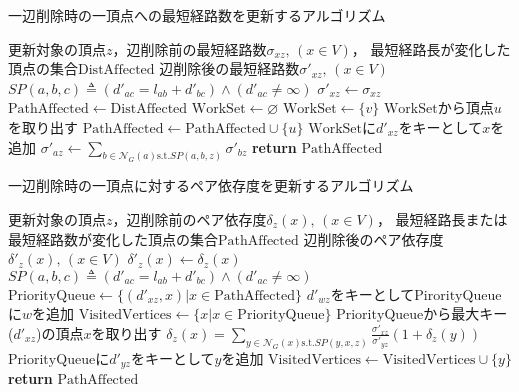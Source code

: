 \begin{algorithm}[H]
  \caption{一辺削除時の一頂点への最短経路数を更新するアルゴリズム}
  \label{algo:update-sigma-on-delete}
  \begin{algorithmic}[1]
    \Require 更新対象の頂点$z$，辺削除前の最短経路数$\sigma_{xz},\,(x\in V)$，
    最短経路長が変化した頂点の集合$\mathrm{DistAffected}$
    \Ensure 辺削除後の最短経路数$\sigma'_{xz},\,(x\in V)$
    \State $SP(a,b,c)\triangleq(d'_{ac}=l_{ab}+d'_{bc})\land(d'_{ac}\neq\infty)$
    \State $\sigma'_{xz}\gets\sigma_{xz}$
    \State $\mathrm{PathAffected}\gets\mathrm{DistAffected}$
    \State $\mathrm{WorkSet}\gets\varnothing$
    \Else
    \State $\mathrm{WorkSet}\gets\{v\}$
    \EndIf
    \State $\mathrm{WorkSet}$から頂点$u$を取り出す
    \State $\mathrm{PathAffected}\gets\mathrm{PathAffected}\cup\{u\}$
    \State $\mathrm{WorkSet}$に$d'_{xz}$をキーとして$x$を追加
    \EndIf
    \EndFor
    \EndWhile
    \State $\sigma'_{az}\gets\sum_{b\in\mathcal{N}_G(a)\mathrm{s.t.}SP(a,b,z)}\sigma'_{bz}$
    \EndFor
    \State \textbf{return} $\mathrm{PathAffected}$
    \EndProcedure
  \end{algorithmic}
\end{algorithm}

\begin{algorithm}[H]
  \caption{一辺削除時の一頂点に対するペア依存度を更新するアルゴリズム}
  \label{algo:update-pd-on-delete}
  \begin{algorithmic}[1]
    \Require 更新対象の頂点$z$，辺削除前のペア依存度$\delta_z(x),\,(x\in V)$，
    最短経路長または最短経路数が変化した頂点の集合$\mathrm{PathAffected}$
    \Ensure 辺削除後のペア依存度$\delta'_z(x),\,(x\in V)$
    \State $\delta'_z(x)\gets\delta_z(x)$
    \State $SP(a,b,c)\triangleq(d'_{ac}=l_{ab}+d'_{bc})\land(d'_{ac}\neq\infty)$
    \State $\mathrm{PriorityQueue}\gets\{(d'_{xz},x)|x\in\mathrm{PathAffected}\}$
    \State $d'_{wz}$をキーとして$\mathrm{PirorityQueue}$に$w$を追加
    \EndIf
    \State $\mathrm{VisitedVertices}\gets\{x|x\in\mathrm{PriorityQueue}\}$
    \State $\mathrm{PriorityQueue}$から最大キー($d'_{xz}$)の頂点$x$を取り出す
    \State $\delta_z(x)=\sum_{y\in\mathcal{N}_G(x)\mathrm{s.t.}SP(y,x,z)}\frac{\sigma'_{xz}}{\sigma'_{yz}}(1+\delta_z(y))$
    \State $\mathrm{PriorityQueue}$に$d'_{yz}$をキーとして$y$を追加
    \State $\mathrm{VisitedVertices}\gets\mathrm{VisitedVertices}\cup\{y\}$
    \EndFor
    \EndIf
    \EndWhile
    \State \textbf{return} $\mathrm{PathAffected}$
    \EndProcedure
  \end{algorithmic}
\end{algorithm}

